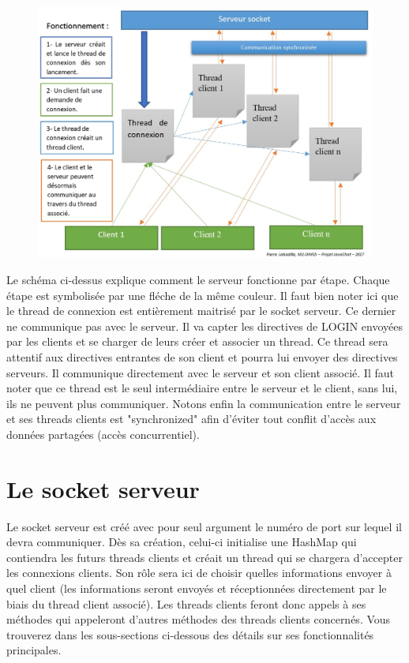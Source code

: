 \documentclass[a4paper,12pt]{report}
\begin{document}
    \begin{figure}[!ht]%
      \centering 
      \includegraphics[width=16cm]{serverWorks.jpg}
    \end{figure}

    \bigbreak
    Le schéma ci-dessus explique comment le serveur fonctionne par étape. Chaque étape est symbolisée par une fléche de la même couleur. Il faut bien noter ici que le thread de connexion est entièrement maitrisé par le socket serveur. Ce dernier ne communique pas avec le serveur. Il va capter les directives de LOGIN envoyées par les clients et se charger de leurs créer et associer un thread.
    \medbreak
    Ce thread sera attentif aux directives entrantes de son client et pourra lui envoyer des directives serveurs. Il communique directement avec le serveur et son client associé. Il faut noter que ce thread est le seul intermédiaire entre le serveur et le client, sans lui, ils ne peuvent plus communiquer. Notons enfin la communication entre le serveur et ses threads clients est "synchronized" afin d'éviter tout conflit d'accès aux données partagées (accès concurrentiel).

    \section{Le socket serveur}
      Le socket serveur est créé avec pour seul argument le numéro de port sur lequel il devra communiquer. Dès sa création, celui-ci initialise une HashMap qui contiendra les futurs threads clients et créait un thread qui se chargera d'accepter les connexions clients.
      \medbreak
      Son rôle sera ici de choisir quelles informations envoyer à quel client (les informations seront envoyés et réceptionnées directement par le biais du thread client associé). Les threads clients feront donc appels à ses méthodes qui appeleront d'autres méthodes des threads clients concernés.
      \medbreak
      Vous trouverez dans les sous-sections ci-dessous des détails sur ses fonctionnalités principales.
\end{document}
